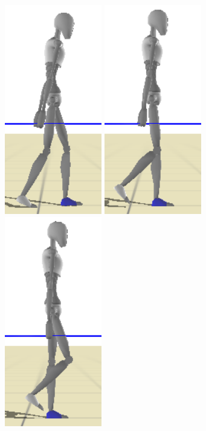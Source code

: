 \documentclass[conference]{acmsiggraph}
\begin{document}
\begin{figure}[t]
\includegraphics[scale=0.17]{images/strips/0_75/1.png}
\includegraphics[scale=0.17]{images/strips/0_75/2.png}
\includegraphics[scale=0.17]{images/strips/0_75/3.png}

\end{figure}
\end{document}
